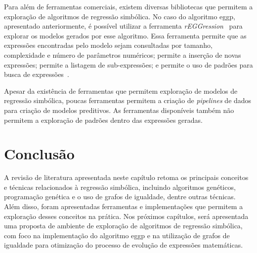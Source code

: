 Para além de ferramentas comerciais, existem diversas bibliotecas que permitem a exploração de algoritmos de regressão simbólica. No caso do algoritmo eggp, apresentado anteriormente, é possível utilizar a ferramenta \textit{rEGGression}~\cite{rEGGression} para explorar os modelos gerados por esse algoritmo. Essa ferramenta permite que as expressões encontradas pelo modelo sejam consultadas por tamanho, complexidade e número de parâmetros numéricos; permite a inserção de novas expressões; permite a listagem de sub-expressões; e permite o uso de padrões para busca de expressões~\cite{rEGGression}.

Apesar da existência de ferramentas que permitem exploração de modelos de regressão simbólica, poucas ferramentas permitem a criação de \textit{pipelines} de dados para criação de modelos preditivos. As ferramentas disponíveis também não permitem a exploração de padrões dentro das expressões geradas.

\section{Conclusão}

A revisão de literatura apresentada neste capítulo retoma os principais conceitos e técnicas relacionados à regressão simbólica, incluindo algoritmos genéticos, programação genética e o uso de grafos de igualdade, dentre outras técnicas. Além disso, foram apresentadas ferramentas e implementações que permitem a exploração desses conceitos na prática. Nos próximos capítulos, será apresentada uma proposta de ambiente de exploração de algoritmos de regressão simbólica, com foco na implementação do algoritmo eggp e na utilização de grafos de igualdade para otimização do processo de evolução de expressões matemáticas.
